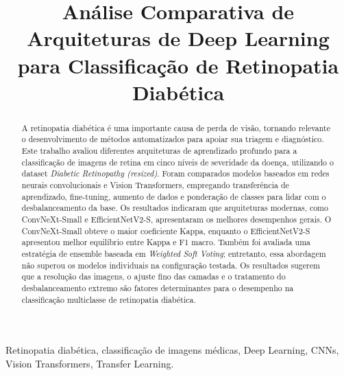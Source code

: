 \documentclass[conference]{IEEEtran}
\begin{document}
\title{Análise Comparativa de Arquiteturas de Deep Learning para
Classificação de Retinopatia Diabética}

\author{
}

\maketitle

\begin{abstract}
A retinopatia diabética é uma importante causa de perda de visão,
tornando relevante o desenvolvimento de métodos automatizados para
apoiar sua triagem e diagnóstico. Este trabalho avaliou diferentes
arquiteturas de aprendizado profundo para a classificação de
imagens de retina em cinco níveis de severidade da doença,
utilizando o dataset \textit{Diabetic Retinopathy (resized)}. Foram
comparados modelos baseados em redes neurais convolucionais e Vision
Transformers, empregando transferência de aprendizado, fine-tuning,
aumento de dados e ponderação de classes para lidar com o
desbalanceamento da base. Os resultados indicaram que arquiteturas
modernas, como ConvNeXt-Small e EfficientNetV2-S, apresentaram os
melhores desempenhos gerais. O ConvNeXt-Small obteve o maior coeficiente
Kappa, enquanto o EfficientNetV2-S apresentou melhor equilíbrio entre
Kappa e F1 macro. Também foi avaliada uma estratégia de ensemble
baseada em \textit{Weighted Soft Voting}; entretanto, essa abordagem
não superou os modelos individuais na configuração testada. Os
resultados sugerem que a resolução das imagens, o ajuste fino das
camadas e o tratamento do desbalanceamento extremo são fatores determinantes
para o desempenho na classificação multiclasse de retinopatia
diabética.
\end{abstract}

\begin{IEEEkeywords}
Retinopatia diabética, classificação de imagens médicas,
Deep Learning, CNNs, Vision Transformers, Transfer Learning.
\end{IEEEkeywords}
\end{document}
